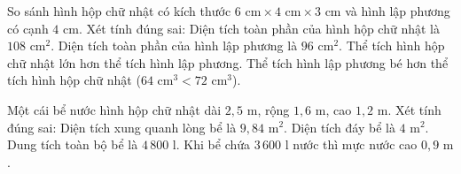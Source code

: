 \begin{ex} %
So sánh hình hộp chữ nhật có kích thước $6\text{ cm} \times 4\text{ cm} \times 3\text{ cm}$ và hình lập phương có cạnh $4\text{ cm}$. Xét tính đúng sai:
\choiceTF
{\True Diện tích toàn phần của hình hộp chữ nhật là $108\text{ cm}^2$.}
{\True Diện tích toàn phần của hình lập phương là $96\text{ cm}^2$.}
{Thể tích hình hộp chữ nhật lớn hơn thể tích hình lập phương.}
{\True Thể tích hình lập phương bé hơn thể tích hình hộp chữ nhật ($64\text{ cm}^3 < 72\text{ cm}^3$).}
\end{ex}

\begin{ex} %
Một cái bể nước hình hộp chữ nhật dài $2{,}5\text{ m}$, rộng $1{,}6\text{ m}$, cao $1{,}2\text{ m}$. Xét tính đúng sai:
\choiceTF
{\True Diện tích xung quanh lòng bể là $9{,}84\text{ m}^2$.}
{\True Diện tích đáy bể là $4\text{ m}^2$.}
{Dung tích toàn bộ bể là $4\,800\text{ l}$.}
{\True Khi bể chứa $3\,600\text{ l}$ nước thì mực nước cao $0{,}9\text{ m}$.}
\end{ex}

